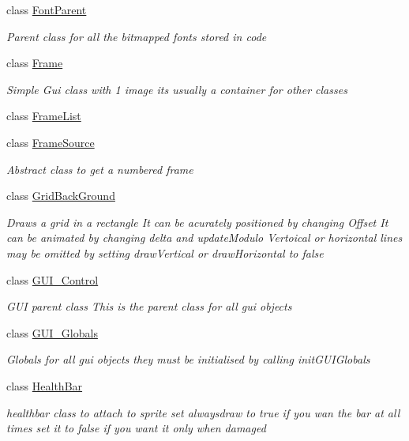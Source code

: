\begin{DoxyCompactItemize}
class \mbox{\hyperlink{class_r_c___framework_1_1_font_parent}{Font\+Parent}}
\begin{DoxyCompactList}\small\item\em Parent class for all the bitmapped fonts stored in code \end{DoxyCompactList}\item 
class \mbox{\hyperlink{class_r_c___framework_1_1_frame}{Frame}}
\begin{DoxyCompactList}\small\item\em Simple Gui class with 1 image its usually a container for other classes \end{DoxyCompactList}\item 
class \mbox{\hyperlink{class_r_c___framework_1_1_frame_list}{Frame\+List}}
\item 
class \mbox{\hyperlink{class_r_c___framework_1_1_frame_source}{Frame\+Source}}
\begin{DoxyCompactList}\small\item\em Abstract class to get a numbered frame \end{DoxyCompactList}\item 
class \mbox{\hyperlink{class_r_c___framework_1_1_grid_back_ground}{Grid\+Back\+Ground}}
\begin{DoxyCompactList}\small\item\em Draws a grid in a rectangle It can be acurately positioned by changing Offset It can be animated by changing delta and update\+Modulo Vertoical or horizontal lines may be omitted by setting draw\+Vertical or draw\+Horizontal to false \end{DoxyCompactList}\item 
class \mbox{\hyperlink{class_r_c___framework_1_1_g_u_i___control}{G\+U\+I\+\_\+\+Control}}
\begin{DoxyCompactList}\small\item\em G\+UI parent class This is the parent class for all gui objects \end{DoxyCompactList}\item 
class \mbox{\hyperlink{class_r_c___framework_1_1_g_u_i___globals}{G\+U\+I\+\_\+\+Globals}}
\begin{DoxyCompactList}\small\item\em Globals for all gui objects they must be initialised by calling init\+G\+U\+I\+Globals \end{DoxyCompactList}\item 
class \mbox{\hyperlink{class_r_c___framework_1_1_health_bar}{Health\+Bar}}
\begin{DoxyCompactList}\small\item\em healthbar class to attach to sprite set alwaysdraw to true if you wan the bar at all times set it to false if you want it only when damaged \end{DoxyCompactList}\item 

\end{DoxyCompactItemize}
